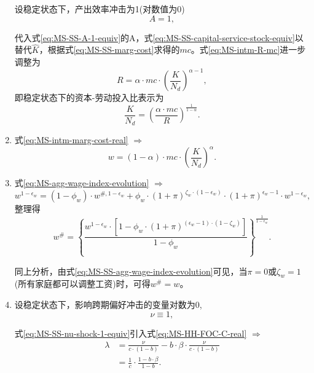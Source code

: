 \begin{enumerate}
设稳定状态下，产出效率冲击为1(对数值为0)
\begin{equation}
\label{eq:MS-SS-A-1-equiv}
A = 1,
\end{equation}

代入式\eqref{eq:MS-SS-A-1-equiv}的A，式\eqref{eq:MS-SS-capital-service-stock-equiv}以替代$\hat{K}$，根据式\eqref{eq:MS-SS-marg-cost}求得的$mc$。式\eqref{eq:MS-intm-R-mc}进一步调整为
\begin{equation*}
R = \alpha \cdot mc \cdot \left( \frac{K}{N_{d}}\right)^{\alpha - 1},
\end{equation*}
即稳定状态下的资本-劳动投入比表示为
\begin{equation}
\label{eq:MS-SS-intm-R-mc}
\frac{K}{N_{d}} = \left(\frac{\alpha \cdot mc}{R} \right)^{\frac{1}{1-\alpha}}.
\end{equation}

\item 式\eqref{eq:MS-intm-marg-cost-real} $\Rightarrow$
\begin{equation}
\label{eq:MS-SS-intm-marg-cost-real}
w = \left( 1-\alpha \right) \cdot mc \cdot \left( \frac{K}{N_d}\right)^{\alpha}.
\end{equation}

\item 式\eqref{eq:MS-agg-wage-index-evolution} $\Rightarrow$
\begin{equation*}
w^{1-\epsilon_w} = \left(1-\phi_w \right) \cdot w^{\#, 1-\epsilon_w} + \phi_w \cdot \left(1+\pi \right)^{\zeta_w \cdot \left( 1 - \epsilon_w \right)} \cdot \left( 1 + \pi \right)^{\epsilon_w - 1} \cdot w^{1 - \epsilon_w},
\end{equation*}
整理得
\begin{equation}
\label{eq:MS-SS-agg-wage-index-evolution}
w^{\#} = \left\{
  \frac{
    w^{1-\epsilon_w} \cdot
  \left[ 1 - \phi_w \cdot \left( 1+\pi \right)^{\left(\epsilon_w - 1\right) \cdot \left( 1 - \zeta_w \right)} \right]
  }{
    1-\phi_w
  }
\right\}^{\frac{1}{1-\epsilon_w}}.
\end{equation}

同上分析，由式\eqref{eq:MS-SS-agg-wage-index-evolution}可见，当$\pi = 0$或$\zeta_w = 1$(所有家庭都可以调整工资)时，可得$w^{\#} = w$。

\item 设稳定状态下，影响跨期偏好冲击的变量对数为0,
\begin{equation}
\label{eq:MS-SS-nu-shock-1-equiv}
\nu \equiv 1,
\end{equation}

式\eqref{eq:MS-SS-nu-shock-1-equiv}引入式\eqref{eq:MS-HH-FOC-C-real} $\Rightarrow$
\begin{equation}
\label{eq:MS-SS-HH-FOC-C-real}
\begin{split}
\lambda &= \frac{\nu}{c \cdot (1-b)} - b \cdot \beta \cdot \frac{\nu}{c \cdot (1-b)} \\
&= \frac{1}{c} \cdot \frac{1 - b \cdot \beta}{1 - b}.
\end{split}
\end{equation}


\end{enumerate}
